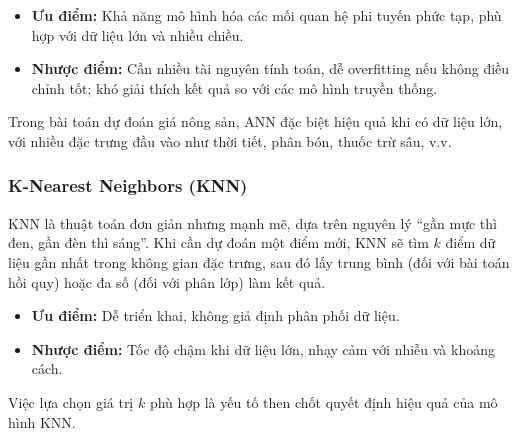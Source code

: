 \begin{itemize}
    \item \textbf{Ưu điểm:} Khả năng mô hình hóa các mối quan hệ phi tuyến phức tạp, phù hợp với dữ liệu lớn và nhiều chiều.
    \item \textbf{Nhược điểm:} Cần nhiều tài nguyên tính toán, dễ overfitting nếu không điều chỉnh tốt; khó giải thích kết quả so với các mô hình truyền thống.
\end{itemize}

Trong bài toán dự đoán giá nông sản, ANN đặc biệt hiệu quả khi có dữ liệu lớn, với nhiều đặc trưng đầu vào như thời tiết, phân bón, thuốc trừ sâu, v.v.

\subsubsection{ K-Nearest Neighbors (KNN)}

KNN là thuật toán đơn giản nhưng mạnh mẽ, dựa trên nguyên lý “gần mực thì đen, gần đèn thì sáng”. Khi cần dự đoán một điểm mới, KNN sẽ tìm \( k \) điểm dữ liệu gần nhất trong không gian đặc trưng, sau đó lấy trung bình (đối với bài toán hồi quy) hoặc đa số (đối với phân lớp) làm kết quả.

\begin{itemize}
    \item \textbf{Ưu điểm:} Dễ triển khai, không giả định phân phối dữ liệu.
    \item \textbf{Nhược điểm:} Tốc độ chậm khi dữ liệu lớn, nhạy cảm với nhiễu và khoảng cách.
\end{itemize}

Việc lựa chọn giá trị \( k \) phù hợp là yếu tố then chốt quyết định hiệu quả của mô hình KNN.



